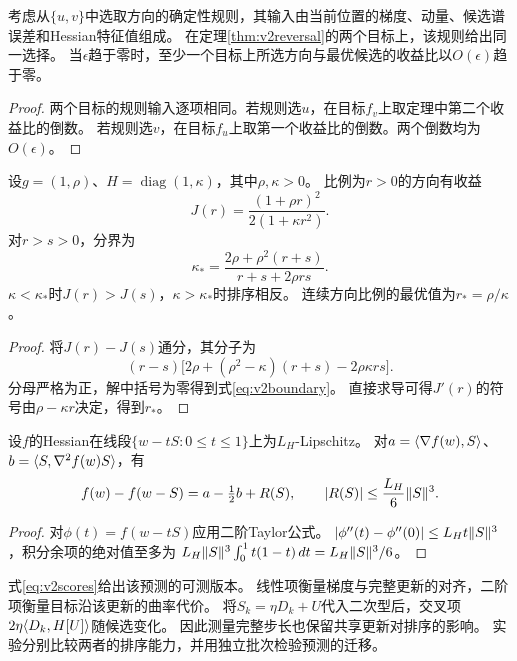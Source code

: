 \begin{corollary}[谱信息相同时的选择代价]\label{cor:v2selector}
考虑从$\{u,v\}$中选取方向的确定性规则，其输入由当前位置的梯度、动量、候选谱误差和Hessian特征值组成。
在定理\ref{thm:v2reversal}的两个目标上，该规则给出同一选择。
当$\epsilon$趋于零时，至少一个目标上所选方向与最优候选的收益比以$O(\epsilon)$趋于零。
\end{corollary}
\begin{proof}
两个目标的规则输入逐项相同。若规则选$u$，在目标$f_v$上取定理中第二个收益比的倒数。
若规则选$v$，在目标$f_u$上取第一个收益比的倒数。两个倒数均为$O(\epsilon)$。
\end{proof}

\begin{proposition}[二维谱方向的精确分界]\label{prop:v2boundary}
设$g=(1,\rho)$、$H=\operatorname{diag}(1,\kappa)$，其中$\rho,\kappa>0$。
比例为$r>0$的方向有收益
\[
 J(r)=\frac{(1+\rho r)^2}{2(1+\kappa r^2)}.
\]
对$r>s>0$，分界为
\begin{equation}\label{eq:v2boundary}
 \kappa_* =\frac{2\rho+\rho^2(r+s)}{r+s+2\rho rs}.
\end{equation}
$\kappa<\kappa_*$时$J(r)>J(s)$，$\kappa>\kappa_*$时排序相反。
连续方向比例的最优值为$r_*=\rho/\kappa$。
\end{proposition}
\begin{proof}
将$J(r)-J(s)$通分，其分子为
\[
 (r-s)\big[2\rho+(\rho^2-\kappa)(r+s)-2\rho\kappa rs\big].
\]
分母严格为正，解中括号为零得到式\eqref{eq:v2boundary}。
直接求导可得$J'(r)$的符号由$\rho-\kappa r$决定，得到$r_*$。
\end{proof}

\begin{proposition}[完整参数步长的局部预测]\label{prop:v2taylor}
设$f$的Hessian在线段$\{w-tS:0\le t\le1\}$上为$L_H$-Lipschitz。
对$a=\langle \nabla f(w),S\rangle$、$b=\langle S,\nabla^2f(w)S\rangle$，有
\begin{equation}
 f(w)-f(w-S)=a-\tfrac12b+R(S),\qquad
 |R(S)|\le\frac{L_H}{6}\lVert S\rVert^3.
\end{equation}
\end{proposition}
\begin{proof}
对$\phi(t)=f(w-tS)$应用二阶Taylor公式。
$|\phi''(t)-\phi''(0)|\le L_H t\lVert S\rVert^3$，积分余项的绝对值至多为
$L_H\lVert S\rVert^3\int_0^1t(1-t)\,dt=L_H\lVert S\rVert^3/6$。
\end{proof}
式\eqref{eq:v2scores}给出该预测的可测版本。
线性项衡量梯度与完整更新的对齐，二阶项衡量目标沿该更新的曲率代价。
将$S_k=\eta D_k+U$代入二次型后，交叉项$2\eta\langle D_k,H[U]\rangle$随候选变化。
因此测量完整步长也保留共享更新对排序的影响。
实验分别比较两者的排序能力，并用独立批次检验预测的迁移。

